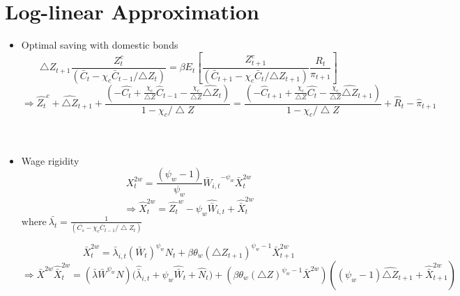 \documentclass[11pt, a4paper]{article}
\begin{document}
\section{Log-linear Approximation}
\small
\begin{itemize}
\item Optimal saving with domestic bonds
\[\bigtriangleup Z_{t+1}\frac{Z_t^c}{(\bar{C}_t - \chi_c \bar{C}_{t-1}/{\bigtriangleup Z_t})} = \beta E_t \left[ \frac{Z_{t+1}^c}{(\bar{C}_{t+1} - \chi_c \bar{C}_{t}/{\bigtriangleup Z_{t+1}})} \frac{R_t}{\pi_{t+1}} \right] \] 
\begin{equation}
\Rightarrow \widehat{Z_t}^c + \widehat{\bigtriangleup Z}_{t+1} + \frac{\left({-\widehat{C_t} + \frac{\chi_c }{\bigtriangleup Z} \widehat{C}_{t-1} -\frac{\chi_c}{\bigtriangleup Z} \widehat{\bigtriangleup Z}_t}\right)}{1-\chi_c / \bigtriangleup Z}  = \frac{\left({-\widehat{C}_{t+1} + \frac{\chi_c }{\bigtriangleup Z} \widehat{C_{t}} -\frac{\chi_c}{\bigtriangleup Z} \widehat{\bigtriangleup Z}_{t+1}}\right)}{1-\chi_c / \bigtriangleup Z}  + \widehat{R}_t - \widehat{\pi}_{t+1}\end{equation}
~\\~

\item Wage rigidity
 \[  X_{t}^{2w} =\frac{(\psi_w-1)}{\psi_w} {\bar{W}_{i,t}}^{-\psi_w} \bar{X}_t^{2w} \]
  \begin{equation} \Rightarrow \widehat{X}_{t}^{2w} = \widehat{Z_t}^w - {\psi_w}{\widehat{\bar{W}}_{i,t}} +  \widehat{\bar{X}}_t^{2w} \end{equation}
$\text{where} ~\bar{\lambda_t}= \frac{1}{ (\bar{C_s}-\chi_c {\bar{C}_{t-1}}/\bigtriangleup Z_t)}$ 

\[ \bar{X}_t^{2w} =  {{\bar{\lambda}_{i,t}}  \left({\bar{W}_{t}} \right)^{\psi_w} N_t} + \beta \theta_w { \left({\bigtriangleup Z_{t+1}}\right)^{\psi_w-1}} \bar{X}_{t+1}^{2w} \]
 \begin{equation} \Rightarrow {\bar{X}^{2w}}\widehat{\bar{X}}_t^{2w} = 
  ({{\bar{\lambda}}  {\bar{W}} ^{\psi_w} N})({{\widehat{\bar{\lambda}}_{i,t}}  +\psi_w {\widehat{\bar{W}}_{t}} + \widehat{ N}_t)} + (\beta \theta_w  (\bigtriangleup Z)^{\psi_w -1} \bar{X}^{2w} )( (\psi_w -1)\widehat{\bigtriangleup Z}_{t+1} + \widehat{\bar{X}}_{t+1}^{2w})  \end{equation}
  

\end{itemize}
\end{document}
